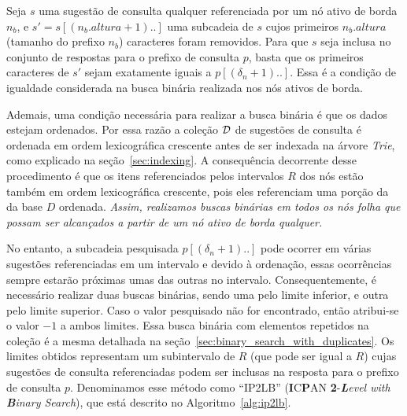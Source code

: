 Seja $s$ uma sugestão de consulta qualquer referenciada por um nó ativo de borda $n_{b}$, e $s' = s[(n_{b}.altura+1)..]$ uma subcadeia de $s$ cujos primeiros $n_{b}.altura$ (tamanho do prefixo $n_{b}$) caracteres foram removidos. Para que $s$ seja inclusa no conjunto de respostas para o prefixo de consulta $p$, basta que os primeiros caracteres de $s'$ sejam exatamente iguais a $p[(\delta_{n} + 1)..]$. Essa é a condição de igualdade considerada na busca binária realizada nos nós ativos de borda.

Ademais, uma condição necessária para realizar a busca binária é que os dados estejam ordenados. Por essa razão a coleção $\mathcal{D}$ de sugestões de consulta é ordenada em ordem lexicográfica crescente antes de ser indexada na árvore \textit{Trie}, como explicado na seção~\ref{sec:indexing}. A consequência decorrente desse procedimento é que os itens referenciados pelos intervalos $R$ dos nós estão também em ordem lexicográfica crescente, pois eles referenciam uma porção da da base $D$ ordenada. \textit{Assim, realizamos buscas binárias em todos os nós folha que possam ser alcançados a partir de um nó ativo de borda qualquer.} 

No entanto, a subcadeia pesquisada $p[(\delta_{n} + 1)..]$ pode ocorrer em várias sugestões referenciadas em um intervalo e devido à ordenação, essas ocorrências sempre estarão próximas umas das outras no intervalo. Consequentemente, é necessário realizar duas buscas binárias, sendo uma pelo limite inferior, e outra pelo limite superior. Caso o valor pesquisado não for encontrado, então atribui-se o valor $-1$ a ambos limites. Essa busca binária com elementos repetidos na coleção é a mesma detalhada na seção~\ref{sec:binary_search_with_duplicates}. Os limites obtidos representam um subintervalo de $R$ (que pode ser igual a $R$) cujas sugestões de consulta referenciadas podem ser inclusas na resposta para o prefixo de consulta $p$. Denominamos esse método como ``IP2LB'' (\textbf{I}C\textbf{P}AN \textbf{2}-\textit{\textbf{L}evel with \textbf{B}inary Search}), que está descrito no Algoritmo~\ref{alg:ip2lb}.

